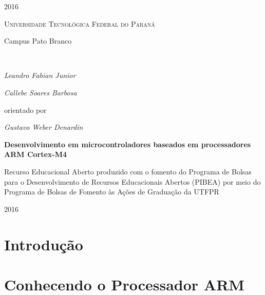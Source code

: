\documentclass[a4paper,10pt,oneside]{book}
\begin{document}
\begin{titlepage}
	{\large2016\par}
	\newpage
 \vfill
  \begin{center}
   {\scshape \LARGE Universidade Tecnológica Federal do Paraná\par\vspace{5pt} \Large Campus Pato Branco} \\[2.5cm]

   \begin{minipage}{\textwidth}
		\centering
		\Large\itshape Leandro Fabian Junior\par
		\Large\itshape Callebe Soares Barbosa\par
	\end{minipage}
	\vspace{1cm}
	
	{orientado por\par
	\Large\itshape Gustavo Weber Denardin}
	\vfill

   {\huge\bfseries Desenvolvimento em microcontroladores baseados em processadores ARM Cortex-M4\par}
   \vfill

   \hspace{.45\textwidth} %
   \begin{minipage}{.5\textwidth}
   \large Recurso Educacional Aberto produzido com o fomento do Programa de Bolsas para o Desenvolvimento de Recursos Educacionais Abertos (PIBEA) por meio do Programa de Bolsas de Fomento às Ações de Graduação da UTFPR
  \end{minipage}
  \vfill
  \hspace{11cm}
	
\vspace{2cm}

{\large2016\par}
\end{center}
\end{titlepage} 

\setcounter{page}{2}
\listoffigures
\listoftables

\dominitoc
\nomtcrule
\tableofcontents

\chapter{Introdução}


\chapter{Conhecendo o Processador ARM}

\end{document}
